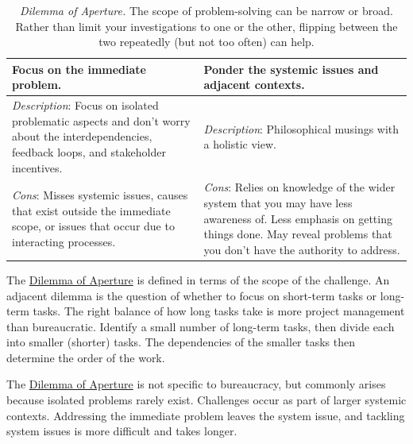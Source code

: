 \begin{center}
\begin{table}[H] %
\begin{tabular}{ | m{\dilemmatablewidth}| m{\dilemmatablewidth} | } 
  \hline
  \textbf{Focus on the immediate problem.} &
  \textbf{Ponder the systemic issues and adjacent contexts.} \\
  \hline
  \textit{Description}: Focus on isolated problematic aspects and don't worry about the interdependencies, feedback loops, and stakeholder incentives. &
  \textit{Description}: Philosophical musings with a holistic view. \\
  \hline
  \textit{Cons}: Misses systemic issues, causes that exist outside the immediate scope, or issues that occur due to interacting processes. & 
  \textit{Cons}: Relies on knowledge of the wider system that you may have less awareness of. Less emphasis on getting things done. May reveal problems that you don't have the authority to address. \\
  \hline
\end{tabular}
\caption{
\textit{Dilemma of Aperture.}
The scope of problem-solving can be narrow or broad. Rather than limit your investigations to one or the other, flipping between the two repeatedly (but not too often) can help.
}
\label{table:dilemma-personal-focus-vs-systemic}
\end{table}
\end{center}

The \hyperref[table:dilemma-personal-focus-vs-systemic]{Dilemma of Aperture} 
\iftoggle{printedonpaper}{ (\ref{table:dilemma-personal-focus-vs-systemic}) }{}%
is defined in terms of the scope of the challenge. An adjacent dilemma is the question of whether to focus on short-term tasks or long-term tasks. The right balance of how long tasks take is more project management than bureaucratic. Identify a small number of long-term tasks, then divide each into smaller (shorter) tasks. The dependencies of the smaller tasks then determine the order of the work.

The \hyperref[table:dilemma-personal-focus-vs-systemic]{Dilemma of Aperture} is not specific to bureaucracy, but commonly arises because isolated problems rarely exist. Challenges occur as part of larger systemic contexts. Addressing the immediate problem leaves the system issue, and tackling system issues is more difficult and takes longer. 

